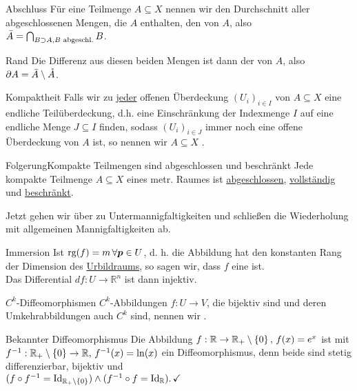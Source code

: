 \begin{Def}
{Abschluss}
Für eine Teilmenge $A\subseteq X$ nennen wir den Durchschnitt aller abgeschlossenen Mengen, die $A$ enthalten, den  von $A$, also $\Bar{A}=\bigcap_{B\supset A, B\text{ abgeschl.}}B$.
\end{Def}
\begin{Def}
{Rand}
Die Differenz aus diesen beiden Mengen ist dann der  von $A$, also $\partial A=\Bar{A}\setminus \mathring{A}$.
\end{Def}
\begin{Def}
{Kompaktheit}
Falls wir zu \underline{jeder} offenen Überdeckung $(U_i)_{i\in I}$ von $A\subseteq X$ eine endliche Teilüberdeckung, d.h. eine Einschränkung der Indexmenge $I$ auf eine endliche Menge $J\subseteq I$ finden, sodass $(U_i)_{i\in J}$ immer noch eine offene Überdeckung von $A$ ist, so nennen wir $A\subseteq X$ .
\end{Def}
\begin{Satz}
{Folgerung}{Kompakte Teilmengen sind abgeschlossen und beschränkt}
Jede kompakte Teilmenge $A\subseteq X$ eines metr. Raumes ist \underline{abgeschlossen}, \underline{vollständig} und \underline{beschränkt}.
\end{Satz}
Jetzt gehen wir über zu Untermannigfaltigkeiten und schließen die Wiederholung mit allgemeinen Mannigfaltigkeiten ab.
\begin{Def}
{Immersion}
Ist $\text{rg}(f)=m\,\forall {{\text{\boldmath${p}$}}}\in U$, d. h. die Abbildung hat den konstanten Rang der Dimension des \underline{Urbildraums}, so sagen wir, dass $f$ eine  ist.\\
Das Differential $df:U\to\mathbb{R}^n$ ist dann injektiv. 
\end{Def}
\begin{Def}
{$C^k$-Diffeomorphismen}
$C^k$-Abbildungen $f:U\to V$, die bijektiv sind und deren Umkehrabbildungen auch $C^k$ sind, nennen wir .
\end{Def}
\begin{Beispiel}
{Bekannter Diffeomorphismus}
Die Abbildung $f:\mathbb{R}\to\mathbb{R}_+\setminus\left\{0\right\},\,f(x)=e^x$ ist mit $f^{-1}:\mathbb{R}_+\setminus\left\{0\right\}\to\mathbb{R},\,f^{-1}(x)=\ln(x)$ ein Diffeomorphismus, denn beide sind stetig differenzierbar, bijektiv und\\
$(f\circ f^{-1}=\text{Id}_{\mathbb{R}_+\setminus\left\{0\right\}})\land (f^{-1}\circ f=\text{Id}_\mathbb{R}).\,\checkmark$
\end{Beispiel}
